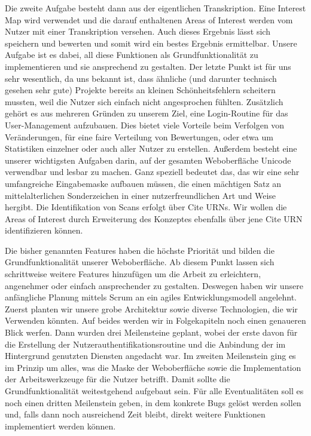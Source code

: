 \documentclass{article}
\begin{document}
Die zweite Aufgabe besteht dann aus der eigentlichen Transkription.
Eine Interest Map wird verwendet und die darauf enthaltenen Areas of Interest werden vom Nutzer mit einer Transkription versehen.
Auch dieses Ergebnis lässt sich speichern und bewerten und somit wird ein bestes Ergebnis ermittelbar.
Unsere Aufgabe ist es dabei, all diese Funktionen als Grundfunktionalität zu implementieren und sie ansprechend zu gestalten.
Der letzte Punkt ist für uns sehr wesentlich, da uns bekannt ist, dass ähnliche (und darunter technisch gesehen sehr gute)
Projekte bereits an kleinen Schönheitsfehlern scheitern mussten, weil die Nutzer sich einfach nicht angesprochen fühlten.
Zusätzlich gehört es aus mehreren Gründen zu unserem Ziel, eine Login-Routine für das User-Management aufzubauen.
Dies bietet viele Vorteile beim Verfolgen von Veränderungen, für eine faire Verteilung von Bewertungen,
oder etwa um Statistiken einzelner oder auch aller Nutzer zu erstellen.
Außerdem besteht eine unserer wichtigsten Aufgaben darin, auf der gesamten Weboberfläche Unicode verwendbar und lesbar zu machen.
Ganz speziell bedeutet das, das wir eine sehr umfangreiche Eingabemaske aufbauen müssen,
die einen mächtigen Satz an mittelalterlichen Sonderzeichen in einer nutzerfreundlichen Art und Weise hergibt.
Die Identifikation von Scans erfolgt über Cite URNs.%
Wir wollen die Areas of Interest durch Erweiterung des Konzeptes ebenfalls über jene Cite URN identifizieren können.

Die bisher genannten Features haben die höchste Priorität und bilden die Grundfunktionalität unserer Weboberfläche.
Ab diesem Punkt lassen sich schrittweise weitere Features hinzufügen um die Arbeit zu erleichtern, angenehmer oder einfach ansprechender zu gestalten.
Deswegen haben wir unsere anfängliche Planung mittels Scrum an ein agiles Entwicklungsmodell angelehnt.
Zuerst planten wir unsere grobe Architektur sowie diverse Technologien, die wir Verwenden könnten.
Auf beides werden wir in Folgekapiteln noch einen genaueren Blick werfen. Dann wurden drei Meilensteine geplant,
wobei der erste davon für die Erstellung der Nutzerauthentifikationsroutine und die Anbindung der im Hintergrund genutzten Diensten angedacht war.
Im zweiten Meilenstein ging es im Prinzip um alles, was die Maske der Weboberfläche sowie die Implementation der Arbeitswerkzeuge für die Nutzer betrifft.
Damit sollte die Grundfunktionalität weitestgehend aufgebaut sein. Für alle Eventualitäten soll es noch einen dritten Meilenstein geben,
in dem konkrete Bugs gelöst werden sollen und, falls dann noch ausreichend Zeit bleibt, direkt weitere Funktionen implementiert werden können.
\end{document}
